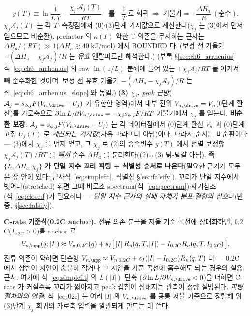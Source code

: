 \begin{equation*}
y(T)\equiv\ln\!\frac{1}{L\,T}-\frac{\chi_j\,\mathcal A_j(T)}{RT}\quad\text{를}\quad \frac1T\ \text{로 회귀} \;\Rightarrow\; \text{기울기}=-\frac{\Delta H_a}{R}\ (\text{순수}).
\end{equation*}
$\chi_j\mathcal A_j(T)$ 는 각 $T\cdot$측정점에서 (0)$\cdot$(3)단계 기지값으로 계산한다($\chi_j$ 는 (3)에서 먼저 얻으므로
비순환). prefactor 의 $\kappa(T)$ 약한 T-의존을 무시하는 근사는 $\Delta H_a/(RT)\gg1$($\Delta H_a\gtrsim40$ kJ/mol)
에서 BOUNDED 다. (보정 전 기울기 $-(\Delta H_a-\chi_j\mathcal A_j)/R$ 는 \emph{유효} 엔탈피로만 해석한다.)
(부록 \S\ref{sec:ch6_arrhenius} 식~\eqref{eq:ch6_arrhenius} 의 raw $\ln(1/L)$ 분해에 들어 있는 $+\chi_j\mathcal A_j/RT$ 를
여기서 빼 순수화한 것이며, 보정 전 유효 기울기 $-(\Delta H_a-\chi_j\mathcal A_j)/R$ 는 식~\eqref{eq:ch6_arrhenius_slope} 와 동일.)
\textbf{(3) $\chi_j$.} \emph{peak 근방}($\mathcal A_j=s_{\phi,j}F(V_{n,\drive}-U_j)$ 가 유한한 영역)에서 내부 전위
$V_{n,\drive}=V_n$(0단계 환산)를 가로축으로 $\partial\ln L/\partial V_{n,\drive}=-\chi_j s_{\phi,j}F/RT$ 기울기에서
$\chi_j$ 를 얻는다. \textbf{비순환 보장}: $\mathcal A_j=s_{\phi,j}F(V_{n,\drive}-U_j)$ 는 각 데이터점에서 (0)단계 환산
$V_n$ 과 (0)단계 고정 $U_j(T)$ 로 \emph{계산되는 기지값}(자유 파라미터 아님)이다. 따라서 순서는 비순환이다 — (3)에서
$\chi_j$ 를 먼저 얻고, 그 $\chi_j$ 로 (2)의 종속변수 $y(T)$ 에서 점별 보정항 $\chi_j\mathcal A_j(T)/RT$ 를 \emph{빼서} 순수
$\Delta H_a$ 를 분리한다((2)↔(3) 닭-달걀 아님). \textbf{즉 $\{L,\Delta H_a,\chi_j\}$ 가 단일 지수 꼬리 피팅
+ 식별성 순서로 나온다}(필요한 근거가 모두 본 장 안에 있다: 근사식~\eqref{eq:simplefit}, 식별성 \S\ref{sec:falsify}). 꼬리가 단일 지수에서
벗어나(stretched) 휘면 그때 비로소 spectrum(식~\eqref{eq:spectrum})$\cdot$자기참조(식~\eqref{eq:closed})가
필요하다 — \emph{단일 지수 근사의 실패 자체가 분포$\cdot$결합의 신호}다(반증, \S\ref{sec:falsify}).

\textbf{C-rate 기준식(0.2C anchor).} 전류 의존 분극을 저율 기준 곡선에 상대화하면, $0.2$C($I_{0.2C}>0$)를 anchor 로
\begin{equation}
V_{n,\app}(q;|I|)\approx V_{n,0.2C}(q)+s_I\big[\,|I|\,R_n(q,T,|I|)-I_{0.2C}R_n(q,T,I_{0.2C})\,\big],
\label{eq:02c}
\end{equation}
전류 의존이 약하면 단순형 $V_{n,\app}\approx V_{n,0.2C}+s_I(|I|-I_{0.2C})R_n(q,T)$ 다 — $0.2$C 에서 상변이 지연이
충분히 작거나 그 지연을 기준 곡선에 흡수해도 되는 경우의 실용 근사. 여기에 식~\eqref{eq:simplefit} 의 $L(|I|)$ 단축
($\partial\ln L/\partial V_{n,\drive}<0$)을 더하면 C-rate 가 커질수록 꼬리가 짧아지고 peak 겹침이 심해지는 관측이
정량 설명된다. \emph{피팅 절차와의 연결}: 식~\eqref{eq:02c} 는 여러 $|I|$ 의 $V_{n,\drive}$ 를 공통 저율 기준으로
정렬해 위 (3)단계 $\chi_j$ 회귀의 가로축 입력을 일관되게 만드는 데 쓴다.

